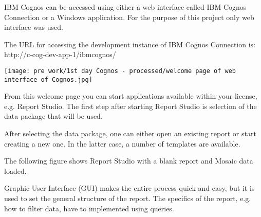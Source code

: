 IBM Cognos can be accessed using either a web interface called IBM Cognos Connection or a Windows application. For the purpose of this project only web interface was used.

The URL for accessing the development instance of IBM Cognos Connection is:\\
http://c-cog-dev-app-1/ibmcognos/

\begin{center}
  \texttt{[image: pre work/1st day Cognos - processed/welcome page of web interface of Cognos.jpg]}
  \label{normal_case}
\end{center}


From this welcome page you can start applications available within your license, e.g. Report Studio. The first step after starting Report Studio is selection of the data package that will be used.


After selecting the data package, one can either open an existing report or start creating a new one. In the latter case, a number of templates are available.


The following figure shows Report Studio with a blank report and Mosaic data loaded.


Graphic User Interface (GUI) makes the entire process quick and easy, but it is used to set the general structure of the report. The specifics of the report, e.g. how to filter data, have to implemented using queries.

